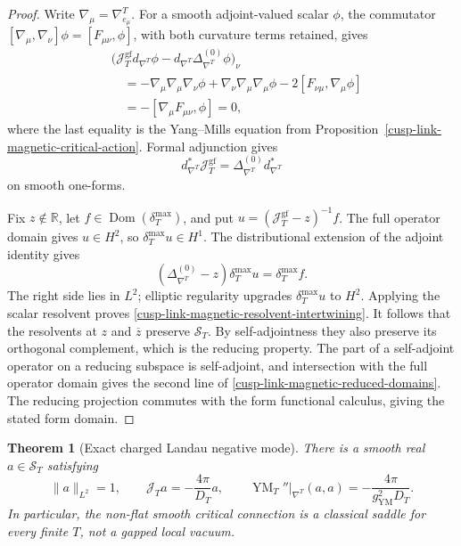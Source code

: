 \documentclass[11pt]{article}
\newtheorem{theorem}{Theorem}[section]
\theoremstyle{definition}
\numberwithin{equation}{section}
\begin{document}
\begin{proof}
Write \(\nabla_\mu=\nabla^T_{e_\mu}\).  For a smooth adjoint-valued scalar
\(\phi\), the commutator
\([\nabla_\mu,\nabla_\nu]\phi=[F_{\mu\nu},\phi]\), with both curvature
terms retained, gives
\begin{align*}
 &\bigl(\mathcal J_T^{\mathrm{gf}}d_{\nabla^T}\phi
       -d_{\nabla^T}\Delta_{\nabla^T}^{(0)}\phi\bigr)_\nu\\
 &\quad=-\nabla_\mu\nabla_\mu\nabla_\nu\phi
        +\nabla_\nu\nabla_\mu\nabla_\mu\phi
        -2[F_{\nu\mu},\nabla_\mu\phi]\\
 &\quad=-[\nabla_\mu F_{\mu\nu},\phi]=0,
\end{align*}
where the last equality is the Yang--Mills equation from
Proposition~\ref{cusp-link-magnetic-critical-action}.  Formal adjunction gives
\[
 d_{\nabla^T}^*\mathcal J_T^{\mathrm{gf}}
 =\Delta_{\nabla^T}^{(0)}d_{\nabla^T}^*
\]
on smooth one-forms.

Fix \(z\notin\mathbb R\), let
\(f\in\operatorname{Dom}(\delta_T^{\max})\), and put
\(u=(\mathcal J_T^{\mathrm{gf}}-z)^{-1}f\).  The full operator domain gives
\(u\in H^2\), so \(\delta_T^{\max}u\in H^1\).  The distributional extension
of the adjoint identity gives
\[
 (\Delta_{\nabla^T}^{(0)}-z)\delta_T^{\max}u
 =\delta_T^{\max}f.
\]
The right side lies in \(L^2\); elliptic regularity upgrades
\(\delta_T^{\max}u\) to \(H^2\).  Applying the scalar resolvent proves
\eqref{cusp-link-magnetic-resolvent-intertwining}.  It follows that the
resolvents at \(z\) and \(\overline z\) preserve \(\mathscr S_T\).  By
self-adjointness they also preserve its orthogonal complement, which is the
reducing property.  The part of a self-adjoint operator on a reducing
subspace is self-adjoint, and intersection with the full operator domain gives
the second line of \eqref{cusp-link-magnetic-reduced-domains}.  The reducing
projection commutes with the form functional calculus, giving the stated form
domain.
\end{proof}

\begin{theorem}[Exact charged Landau negative mode]
\label{cusp-link-magnetic-negative-mode}
There is a smooth real \(a\in\mathscr S_T\) satisfying
\begin{equation}
 \|a\|_{L^2}=1,
 \qquad
 \mathcal J_Ta=-\frac{4\pi}{D_T}a,
 \qquad
 \operatorname{YM}_T''|_{\nabla^T}(a,a)
 =-\frac{4\pi}{g_{\mathrm{YM}}^2D_T}.
 \label{cusp-link-magnetic-negative-eigenvalue}
\end{equation}
In particular, the non-flat smooth critical connection is a classical saddle
for every finite \(T\), not a gapped local vacuum.
\end{theorem}
\end{document}
